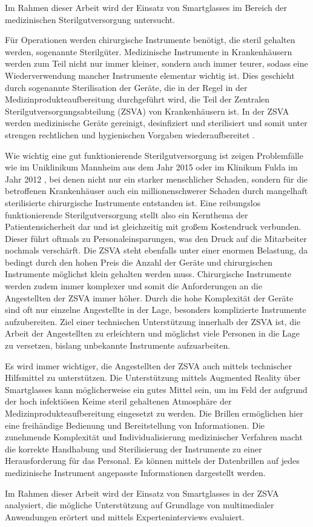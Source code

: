 Im Rahmen dieser Arbeit wird der Einsatz von Smartglasses im Bereich der medizinischen Sterilgutversorgung untersucht. 

Für Operationen werden chirurgische Instrumente benötigt, die steril gehalten werden, sogenannte Sterilgüter.
Medizinische Instrumente in Krankenhäusern werden zum Teil nicht nur immer kleiner, sondern auch immer teurer, sodass eine Wiederverwendung mancher Instrumente elementar wichtig ist. Dies geschieht durch sogenannte Sterilisation der Geräte, die in der Regel in der Medizinprodukteaufbereitung durchgeführt wird, die Teil der Zentralen Sterilgutversorgungsabteilung (ZSVA) von Krankenhäusern ist. In der ZSVA werden medizinische Geräte gereinigt, desinfiziert und sterilisiert und somit unter strengen rechtlichen und hygienischen Vorgaben wiederaufbereitet \cite{AKI-ArbeitskreisInstrumenten-Aufbereitung2012}.

Wie wichtig eine gut funktionierende Sterilgutversorgung ist zeigen Problemfälle wie im Uniklinikum Mannheim \cite{Brandt2015} aus dem Jahr 2015 oder im Klinikum Fulda im Jahr 2012 \cite{HygieneFuldar2012}, bei denen nicht nur ein starker menschlicher Schaden, sondern für die betroffenen Krankenhäuser auch ein millionenschwerer Schaden durch mangelhaft sterilisierte chirurgische Instrumente entstanden ist. Eine reibungslos funktionierende Sterilgutversorgung stellt also ein Kernthema der Patientensicherheit dar und ist gleichzeitig mit großem Kostendruck verbunden. Dieser führt oftmals zu Personaleinsparungen, was den Druck auf die Mitarbeiter nochmals verschärft. Die ZSVA steht ebenfalls unter einer enormen Belastung, da bedingt durch den hohen Preis die Anzahl der Geräte und chirurgischen Instrumente möglichst klein gehalten werden muss. Chirurgische Instrumente werden zudem immer komplexer und somit die Anforderungen an die Angestellten der ZSVA immer höher. Durch die hohe Komplexität der Geräte sind oft nur einzelne Angestellte in der Lage, besonders komplizierte Instrumente aufzubereiten. Ziel einer technischen Unterstützung innerhalb der ZSVA ist, die Arbeit der Angestellten zu erleichtern und möglichst viele Personen in die Lage zu versetzen, bislang unbekannte Instrumente aufzuarbeiten. 

Es wird immer wichtiger, die Angestellten der ZSVA auch mittels technischer Hilfsmittel zu unterstützen. Die Unterstützung mittels Augmented Reality über Smartglasses kann möglicherweise ein gutes Mittel sein, um im Feld der aufgrund der hoch infektiösen Keime steril gehaltenen Atmosphäre der Medizinprodukteaufbereitung eingesetzt zu werden. Die Brillen ermöglichen hier eine freihändige Bedienung und Bereitstellung von Informationen. Die zunehmende Komplexität und Individualisierung medizinischer Verfahren macht die korrekte Handhabung und Sterilisierung der Instrumente zu einer Herausforderung für das Personal. Es können mittels der Datenbrillen auf jedes medizinische Instrument angepasste Informationen dargestellt werden. 

Im Rahmen dieser Arbeit wird der Einsatz von Smartglasses in der ZSVA analysiert, die mögliche Unterstützung auf Grundlage von multimedialer Anwendungen erörtert und mittels Experteninterviews evaluiert. 